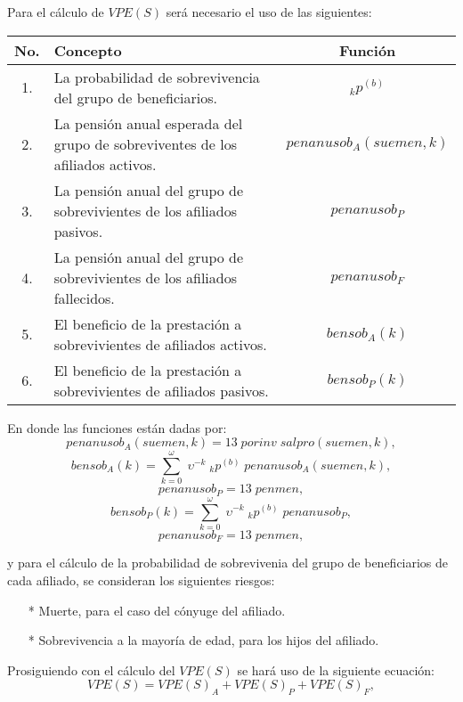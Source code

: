 \documentclass[12pt,letterpaper,titlepage]{article}
\begin{document}
{Para el cálculo de $V\!PE(S)$ será necesario el uso de las siguientes:
\begin{center}
	\begin{tabular}{|c||p{8cm}||c|} %
		\hline 
		\rule[-1ex]{0pt}{2.5ex}No. & Concepto & Función \\ 
		\hline 
		\hline 
		\rule[-1ex]{0pt}{2.5ex} 1. & La probabilidad de sobrevivencia del grupo de beneficiarios. & $_{k}p^{(b)}$ \\ 
		\hline 
		\rule[-1ex]{0pt}{2.5ex} 2. & La pensión anual esperada del grupo de sobreviventes de los afiliados activos. & $penanusob_{A}(suemen,k)$\\
		\hline 
		\rule[-1ex]{0pt}{2.5ex} 3. & La pensión anual del grupo de sobrevivientes de los afiliados pasivos. & $penanusob_{P}$ \\ 
		\hline 
		\rule[-1ex]{0pt}{2.5ex} 4. & La pensión anual del grupo de sobrevivientes de los afiliados fallecidos. & $penanusob_{F}$ \\ 
		\hline 
		\rule[-1ex]{0pt}{2.5ex} 5. & El beneficio de la prestación a sobrevivientes de afiliados activos. & $bensob_{A}(k)$ \\ 
		\hline 
		\rule[-1ex]{0pt}{2.5ex} 6. & El beneficio de la prestación a sobrevivientes de afiliados pasivos. & $bensob_{P}(k)$ \\ 
		\hline 
	\end{tabular} 
\end{center}

En donde las funciones están dadas por:
\[penanusob_{A}(suemen,k)=13\;porinv\;sal\!pro(suemen,k),\]
\[bensob_{A}(k)=\sum\limits_{k=0}^\omega\;\upsilon^{-k}\;_{k}p^{(b)}\;penanusob_{A}(suemen,k),\]
\[penanusob_{P}=13\;penmen,\]
\[bensob_{P}(k)=\sum\limits_{k=0}^\omega\;\upsilon^{-k}\;_{k}p^{(b)}\;penanusob_{P},\]
\[penanusob_{F}=13\;penmen,\]
 
y para el cálculo de la probabilidad de sobrevivenia del grupo de beneficiarios de cada afiliado, se consideran los siguientes riesgos:

\begin{itemize}
	\item [*] Muerte, para el caso del cónyuge del afiliado.
	\item [*] Sobrevivencia a la mayoría de edad, para los hijos del afiliado.
\end{itemize}

Prosiguiendo con el cálculo del $V\!PE(S)$ se hará uso de la siguiente ecuación:
\[V\!PE(S)=V\!PE(S)_{A}+V\!PE(S)_{P}+V\!PE(S)_{F},\]

}
\end{document}
